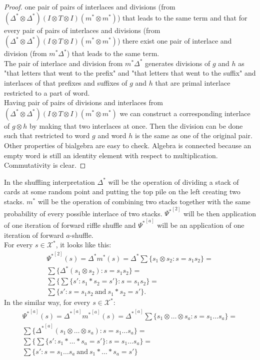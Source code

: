 \documentclass[a4paper, 12pt]{article}
\begin{document}
\begin{proof}
one pair of pairs of interlaces and divisions (from $(\Delta^*\otimes \Delta^*)(I \otimes T \otimes I)(m^*
\otimes m^*)$) that leads to the same term and that for every pair of pairs of interlaces and divisions (from
$(\Delta^*\otimes \Delta^*)(I \otimes T \otimes I)(m^*\otimes m^*)$) there exist one pair of interlace and
 division (from
$m^*\Delta^*$) that leads to the same term. \\
The pair of interlace and division from $m^*\Delta^*$ generates divisions of $g$ and $h$ as "that letters
that went to the prefix" and "that letters that went to the suffix" and interlaces of that prefixes and
 suffixes of $g$ and $h$ that are primal interlace restricted to a part of word. \\
Having pair of pairs of divisions and interlaces from $(\Delta^*\otimes \Delta^*)(I \otimes T \otimes I)
(m^*\otimes m^*)$ we can construct a corresponding interlace of $g \otimes h$ by making that two interlaces
at once. Then the division can be done such that restricted to word $g$ and word $h$ is the same as one of
the original pair. \\
Other properties of bialgebra are easy to check.
Algebra is connected because an empty word
is still an identity element with respect to multiplication. Commutativity is clear.
\end{proof}
In the shuffling interpretation $\Delta^*$ will be the operation of dividing a stack of cards at some random
point and putting the top pile on the left creating two stacks. $m^*$ will be the operation of combining two
stacks together with the same probability of every possible interlace of two stacks.
 ${\Psi^*}^{[2]}$ will be then application of one iteration of forward riffle shuffle and
 ${\Psi^*}^{[a]}$ will be an application of one iteration of forward $a$-shuffle. \\
For every $s \in \mathcal{X}^*$, it looks like this:
\begin{gather*}
{\Psi^*}^{[2]}(s) = \Delta^* m^*(s) = \Delta^* \sum\{s_1 \otimes s_2 : s=s_1s_2\} = \\
\sum\{\Delta^*(s_1 \otimes s_2) : s=s_1s_2\} = \\
\sum\{\sum\{s': s_1*s_2=s'\}:s=s_1s_2\} = \\
\sum\{s' : s=s_1s_2\mathrm{\ and\ }s_1*s_2=s'\}.
\end{gather*}
In the similar way, for every $s \in \mathcal{X}^*$:
\begin{gather*}
{\Psi^*}^{[a]}(s)={\Delta^*}^{[a]} {m^*}^{[a]}(s) = {\Delta^*}^{[a]}\sum\{s_1 \otimes \dots \otimes s_a :
s=s_1\dots s_a\} = \\
\sum\{{\Delta^*}^{[a]}(s_1 \otimes\dots \otimes s_a) : s=s_1\dots s_a\} = \\
\sum\{\sum\{s' : s_1*\dots*s_a = s'\} : s=s_1\dots s_a\} = \\
\sum\{s' : s=s_1\dots s_a\mathrm{\ and\ } s_1* \dots *s_a = s' \}
\end{gather*}
\end{document}

